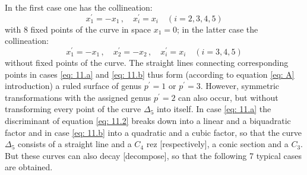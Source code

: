 \documentclass[leqno]{article}
\begin{document}
In the first case one has the collineation: 
\begin{equation}\label{eq: 11.alpha}
x_1^\prime = -x_1 \, , \quad x_i^\prime = x_i \quad (i=2,3,4,5) \tag{$\alpha$}
\end{equation} 
with 8 fixed points of the curve in space $x_1=0$; in the latter case the collineation: 
\begin{equation}\label{eq: 11.beta}
x_1^\prime = -x_1 \, , \quad x_2^\prime = -x_2 \, , \quad x_i^\prime = x_i \quad (i=3,4,5) \tag{$\beta$}
\end{equation} 
without fixed points of the curve. The straight lines connecting corresponding points in cases \eqref{eq: 11.a} and \eqref{eq: 11.b} thus form (according to equation \eqref{eq: A} introduction) a ruled surface of genus $p^\prime=1$ or $p^\prime=3$. However, symmetric transformations with the assigned genus $p^\prime=2$ can also occur, but without transforming every point of the curve $\Delta_5$ into itself. In case \eqref{eq: 11.a} the discriminant of equation \eqref{eq: 11.2} breaks down into a linear and a biquadratic factor and in case \eqref{eq: 11.b} into a quadratic and a cubic factor, so that the curve $\Delta_5$ consists of a straight line and a $C_4$ rez [respectively], a conic section and a $C_3$. But these curves can also decay [decompose], so that the following 7 typical cases are obtained.
\end{document}
